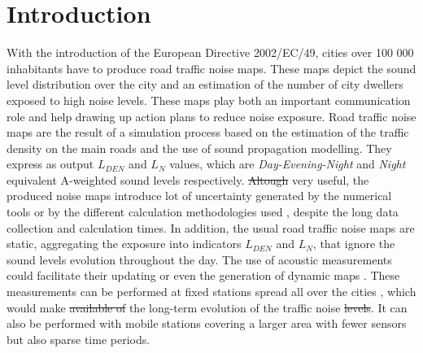 \documentclass[twocolumn]{svjour3}          %
\providecommand{\DIFaddtex}[1]{{\protect\color{blue}\uwave{#1}}} %
\providecommand{\DIFdeltex}[1]{{\protect\color{red}\sout{#1}}}                      %
\providecommand{\DIFaddbegin}{} %
\providecommand{\DIFaddend}{} %
\providecommand{\DIFdelbegin}{} %
\providecommand{\DIFdelend}{} %
\providecommand{\DIFadd}[1]{\texorpdfstring{\DIFaddtex{#1}}{#1}} %
\providecommand{\DIFdel}[1]{\texorpdfstring{\DIFdeltex{#1}}{}} %
\begin{document}
\section{Introduction} \label{part:intro}

With the introduction of the European Directive 2002/\-EC/49, cities over 100 000 inhabitants have to produce road traffic noise maps. These maps depict the sound level distribution over the city and an estimation of the number of city dwellers exposed to high noise levels. These maps play both an important communication role and help drawing up action plans to reduce noise exposure. Road traffic noise maps are the result of a simulation process based on the estimation of the traffic density on the main roads and the use of sound propagation modelling. They express as output $L_ {DEN}$ and $L_N$ values, which are \textit{Day-Evening-Night} and \textit{Night} equivalent A-weighted sound levels respectively. \DIFdelbegin \DIFdel{Altough }\DIFdelend \DIFaddbegin \DIFadd{Although }\DIFaddend very useful, the produced noise maps introduce lot of uncertainty generated by the numerical tools \cite{van_leeuwen_noise_2015} or by the different calculation methodologies used \cite{leroy_uncertainty_2010}\cite{garg_critical_2014}, despite the long data collection and calculation times. In addition, the usual road traffic noise maps are static, aggregating the exposure into indicators $L_{DEN}$ and $L_N$, that ignore the sound levels evolution throughout the day.
The use of acoustic measurements could facilitate their updating or even the generation of dynamic maps \cite{wei_dynamic_2016}. These measurements can be performed at fixed stations spread all over the cities \cite{Mioduszewski} \cite{mietlicki2012innovative}, which would make \DIFdelbegin \DIFdel{available of }\DIFdelend the long-term evolution of the traffic noise \DIFdelbegin \DIFdel{levels}\DIFdelend \DIFaddbegin \DIFadd{available}\DIFaddend . It can also be performed with  mobile stations \cite{can_exploring_2012} \cite{manvell2004sadmam} covering a larger area with fewer sensors but also sparse time periods.
\end{document}

